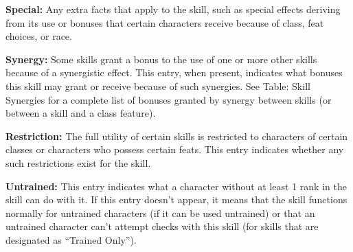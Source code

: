 \textbf{Special:} Any extra facts that apply to the skill, such as special effects deriving from its use or bonuses that certain characters receive because of class, feat choices, or race.

\textbf{Synergy:} Some skills grant a bonus to the use of one or more other skills because of a synergistic effect. This entry, when present, indicates what bonuses this skill may grant or receive because of such synergies. See Table: Skill Synergies for a complete list of bonuses granted by synergy between skills (or between a skill and a class feature).

\textbf{Restriction:} The full utility of certain skills is restricted to characters of certain classes or characters who possess certain feats. This entry indicates whether any such restrictions exist for the skill.

\textbf{Untrained:} This entry indicates what a character without at least 1 rank in the skill can do with it. If this entry doesn’t appear, it means that the skill functions normally for untrained characters (if it can be used untrained) or that an untrained character can’t attempt checks with this skill (for skills that are designated as ``Trained Only'').
























